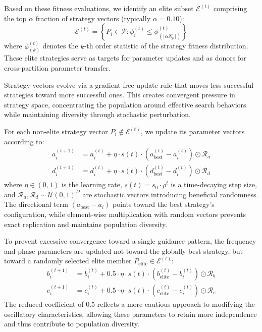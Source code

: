 \documentclass[11pt]{article}
\begin{document}
Based on these fitness evaluations, we identify an elite subset $\mathcal{E}^{(t)}$ comprising the top $\alpha$ fraction of strategy vectors (typically $\alpha = 0.10$):
\begin{equation}
\mathcal{E}^{(t)} = \left\{ P_i \in \mathcal{P} : \phi_i^{(t)} \leq \phi_{(\lceil \alpha N_p \rceil)}^{(t)} \right\}
\label{eq:elite_set}
\end{equation}
where $\phi_{(k)}^{(t)}$ denotes the $k$-th order statistic of the strategy fitness distribution. These elite strategies serve as targets for parameter updates and as donors for cross-partition parameter transfer.

Strategy vectors evolve via a gradient-free update rule that moves less successful strategies toward more successful ones. This creates convergent pressure in strategy space, concentrating the population around effective search behaviors while maintaining diversity through stochastic perturbation.

For each non-elite strategy vector $P_i \notin \mathcal{E}^{(t)}$, we update its parameter vectors according to:
\begin{align}
a_i^{(t+1)} &= a_i^{(t)} + \eta \cdot s(t) \cdot (a_{\text{best}}^{(t)} - a_i^{(t)}) \odot \mathcal{R}_a \label{eq:inspire_a} \\
d_i^{(t+1)} &= d_i^{(t)} + \eta \cdot s(t) \cdot (d_{\text{best}}^{(t)} - d_i^{(t)}) \odot \mathcal{R}_d \label{eq:inspire_d}
\end{align}
where $\eta \in (0,1)$ is the learning rate, $s(t) = s_0 \cdot \rho^t$ is a time-decaying step size, and $\mathcal{R}_a, \mathcal{R}_d \sim \mathcal{U}(0,1)^D$ are stochastic vectors introducing beneficial randomness. The directional term $(a_{\text{best}} - a_i)$ points toward the best strategy's configuration, while element-wise multiplication with random vectors prevents exact replication and maintains population diversity.

To prevent excessive convergence toward a single guidance pattern, the frequency and phase parameters are updated not toward the globally best strategy, but toward a randomly selected elite member $P_{\text{elite}} \in \mathcal{E}^{(t)}$:
\begin{align}
b_i^{(t+1)} &= b_i^{(t)} + 0.5 \cdot \eta \cdot s(t) \cdot (b_{\text{elite}}^{(t)} - b_i^{(t)}) \odot \mathcal{R}_b \\
c_i^{(t+1)} &= c_i^{(t)} + 0.5 \cdot \eta \cdot s(t) \cdot (c_{\text{elite}}^{(t)} - c_i^{(t)}) \odot \mathcal{R}_c
\end{align}
The reduced coefficient of $0.5$ reflects a more cautious approach to modifying the oscillatory characteristics, allowing these parameters to retain more independence and thus contribute to population diversity.
\end{document}

